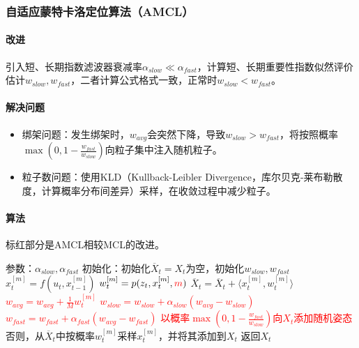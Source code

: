 \documentclass[
12pt, %
a4paper, 
oneside, %
headinclude,footinclude, %
]{scrartcl}
\begin{document}
\subsubsection[自适应蒙特卡洛定位算法]{自适应蒙特卡洛定位算法（AMCL）}
\paragraph{改进}
引入短、长期指数滤波器衰减率$ \alpha_{slow} \ll \alpha_{fast} $，计算短、长期重要性指数似然评价估计$ w_{slow}, w_{fast} $，二者计算公式格式一致，正常时$ w_{slow} < w_{fast} $。
\paragraph{解决问题}
\begin{itemize}
\item 绑架问题：发生绑架时，$ w_{avg} $会突然下降，导致$ w_{slow} > w_{fast} $，将按照概率$ \max(0, 1 - \frac{w_{fast}}{w_{slow}}) $向粒子集中注入随机粒子。
\item 粒子数问题：使用KLD（Kullback-Leibler Divergence，库尔贝克-莱布勒散度，计算概率分布间差异）采样，在收敛过程中减少粒子。
\end{itemize}
\paragraph{算法}
标红部分是AMCL相较MCL的改进。
\begin{myalgorithm}[AMCL]
\State 参数：$ \alpha_{slow}, \alpha_{fast} $
\State 初始化：初始化$ \overline{X}_t = X_t $为空，初始化$ w_{slow}, w_{fast} $
\State $ x_t^{[m]} = f(u_t, x_{t - 1}^{[m]}) $
\State $ w_t^{[m]} = p(z_t, x_t^{[m]}, \textcolor{red}{m}) $
\State $ \overline{X}_t = \overline{X}_t + \langle x_t^{[m]}, w_t^{[m]} \rangle $
\State \textcolor{red}{$ w_{avg} = w_{avg} + \frac{1}{M} w_t^{[m]} $} 
\EndFor
\State \textcolor{red}{$ w_{slow} = w_{slow} + \alpha_{slow}(w_{avg} - w_{slow}) $} 
\State \textcolor{red}{$ w_{fast} = w_{fast} + \alpha_{fast}(w_{avg} - w_{fast}) $} 
\State \textcolor{red}{以概率$ \max(0, 1 - \frac{w_{fast}}{w_{slow}}) $向$ X_t $添加随机姿态} 
\State 否则，从$ \overline{X}_t $中按概率$ w_t^{[m]} $采样$ x_t^{[m]} $，并将其添加到$ X_t $ 
\EndFor
\State 返回$ X_t $
\end{myalgorithm}
\end{document}
